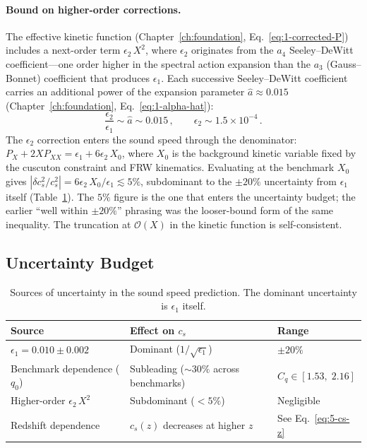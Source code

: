 \paragraph{Bound on higher-order corrections.} The effective kinetic function (Chapter~\ref{ch:foundation}, Eq.~\eqref{eq:1-corrected-P}) includes a next-order term $\epsilon_2\, X^2$, where $\epsilon_2$ originates from the $a_4$ Seeley--DeWitt coefficient---one order higher in the spectral action expansion than the $a_3$ (Gauss--Bonnet) coefficient that produces $\epsilon_1$. Each successive Seeley--DeWitt coefficient carries an additional power of the expansion parameter $\hat{a} \approx 0.015$ (Chapter~\ref{ch:foundation}, Eq.~\eqref{eq:1-alpha-hat}):
\begin{equation}
\label{eq:5-eps2-bound}
\frac{\epsilon_2}{\epsilon_1} \sim \hat{a} \sim 0.015\,, \qquad \epsilon_2 \sim 1.5 \times 10^{-4}\,.
\end{equation}
The $\epsilon_2$ correction enters the sound speed through the denominator: $P_X + 2XP_{XX} = \epsilon_1 + 6\epsilon_2\, X_0$, where $X_0$ is the background kinetic variable fixed by the cuscuton constraint and FRW kinematics. Evaluating at the benchmark $X_0$ gives $|\delta c_s^2/c_s^2| = 6\epsilon_2\, X_0 / \epsilon_1 \lesssim 5\%$, subdominant to the $\pm 20\%$ uncertainty from $\epsilon_1$ itself (Table~\ref{tab:5-2}). The $5\%$ figure is the one that enters the uncertainty budget; the earlier ``well within $\pm 20\%$'' phrasing was the looser-bound form of the same inequality. The truncation at $\mathcal{O}(X)$ in the kinetic function is self-consistent.

\subsection{Uncertainty Budget}
\label{sec:5-uncertainty}

\begin{table}[ht]
\centering
\caption{Sources of uncertainty in the sound speed prediction. The dominant uncertainty is $\epsilon_1$ itself.}
\label{tab:5-2}
\begin{tabular}{lll}
\toprule
Source & Effect on $c_s$ & Range \\
\midrule
$\epsilon_1 = 0.010 \pm 0.002$ & Dominant ($1/\sqrt{\epsilon_1}$) & $\pm 20\%$ \\
Benchmark dependence ($q_0$) & Subleading ($\sim 30\%$ across benchmarks) & $C_q \in [1.53,\; 2.16]$ \\
Higher-order $\epsilon_2\,X^2$ & Subdominant ($< 5\%$) & Negligible \\
Redshift dependence & $c_s(z)$ decreases at higher $z$ & See Eq.~\eqref{eq:5-cs-z} \\
\bottomrule
\end{tabular}
\end{table}

